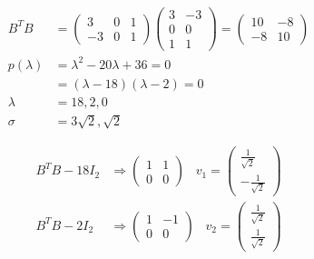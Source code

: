 \begin{align}
    B^T B &= \begin{pmatrix}
        3 & 0 & 1 \\ -3 & 0 & 1
    \end{pmatrix} \begin{pmatrix}
        3 & -3 \\ 0 & 0 \\ 1 & 1
    \end{pmatrix} = \begin{pmatrix}
        10 & -8 \\ -8 & 10
    \end{pmatrix} \\
    p(\lambda) &= \lambda^2 - 20 \lambda + 36 = 0 \\
    &= (\lambda - 18)(\lambda - 2) = 0 \\
    \lambda &= 18, 2, 0 \\
    \sigma &= 3\sqrt{2}, \sqrt{2}
\end{align}

\begin{align}
    B^T B - 18 I_2 &\Rightarrow \begin{pmatrix}
        1 & 1 \\ 0 & 0
    \end{pmatrix} \;\;\; v_1 = \begin{pmatrix}
        \frac{1}{\sqrt{2}} \\ -\frac{1}{\sqrt{2}}
    \end{pmatrix} \\
    B^T B - 2 I_2 &\Rightarrow \begin{pmatrix}
        1 & -1 \\ 0 & 0
    \end{pmatrix} \;\;\; v_2 = \begin{pmatrix}
        \frac{1}{\sqrt{2}} \\ \frac{1}{\sqrt{2}}
    \end{pmatrix}
\end{align}

